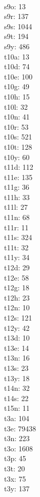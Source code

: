 \begin{multicols}{8}
  \\ s9o: 13
  \\ s9r: 137
  \\ s9s: 1044
  \\ s9t: 194
  \\ s9y: 486
  \\ t10a: 13
  \\ t10d: 74
  \\ t10e: 100
  \\ t10g: 49
  \\ t10h: 15
  \\ t10l: 32
  \\ t10n: 41
  \\ t10r: 53
  \\ t10s: 521
  \\ t10t: 128
  \\ t10y: 60
  \\ t11d: 112
  \\ t11e: 135
  \\ t11g: 36
  \\ t11h: 33
  \\ t11l: 27
  \\ t11n: 68
  \\ t11r: 11
  \\ t11s: 324
  \\ t11t: 32
  \\ t11y: 34
  \\ t12d: 29
  \\ t12e: 58
  \\ t12g: 18
  \\ t12h: 23
  \\ t12n: 10
  \\ t12s: 121
  \\ t12y: 42
  \\ t13d: 10
  \\ t13e: 14
  \\ t13n: 16
  \\ t13s: 23
  \\ t13y: 18
  \\ t14n: 32
  \\ t14s: 22
  \\ t15n: 11
  \\ t3a: 104
  \\ t3e: 79438
  \\ t3n: 223
  \\ t3o: 1608
  \\ t3p: 45
  \\ t3t: 20
  \\ t3x: 75
  \\ t3y: 137

\end{multicols}
